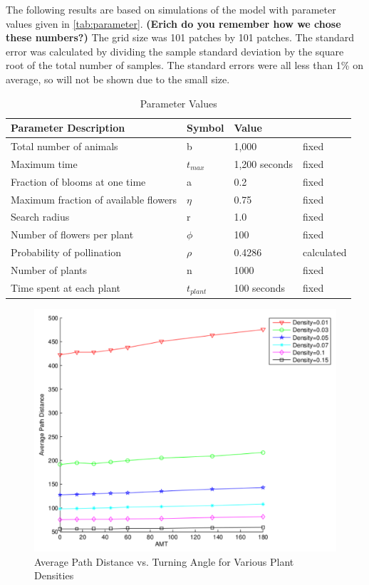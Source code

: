 The following results are based on simulations of the model with parameter
values given in \autoref{tab:parameter}. {\bf (Erich do you remember how we
chose these numbers?)}  The grid size was 101 patches by 101 patches.  The
standard error was calculated by dividing the sample standard deviation by the
square root of the total number of samples.   The standard errors were all less
than 1\% on average, so will not be shown due to the small size.

\begin{table}
  \centering
  \begin{tabular}{|l|l|l|l|}
    \hline
    Parameter Description & Symbol & Value &  \\ \hline  \label{parameter}
    Total number of animals & b & 1,000 & fixed  \\ \hline
    Maximum time & $t_{max}$ & 1,200 seconds & fixed \\ \hline
    Fraction of blooms at one time & a & 0.2 & fixed \\ \hline
    Maximum fraction of available flowers & $\eta$ & 0.75 & fixed \\ \hline
    Search radius & r & 1.0 & fixed \\ \hline
    Number of flowers per plant & $\phi$ & 100 & fixed \\ \hline
    Probability of pollination   & $\rho$ & 0.4286 & calculated \\ \hline
    Number of plants & n & 1000 & fixed \\ \hline
    Time spent at each plant & $t_{plant}$ & 100 seconds & fixed \\ \hline
  \end{tabular}
  \caption{Parameter Values}
  \label{tab:parameter}
\end{table}

\begin{figure}
  \begin{center}
  \includegraphics[scale=0.5]{Figures/PathVsAMT.pdf}
  \end{center}
  \caption{\small Average Path Distance vs. Turning Angle for Various Plant
    Densities}
  \label{AvgPathN}
\end{figure}

